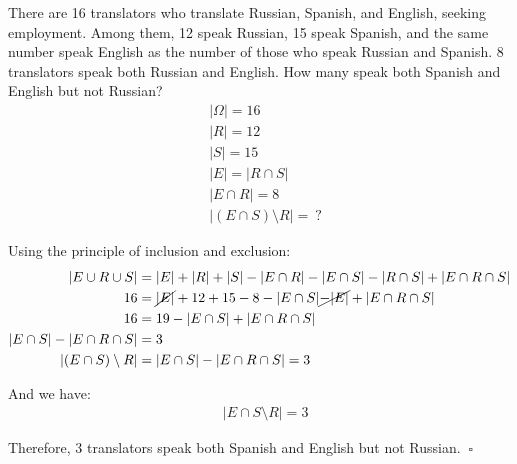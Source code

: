 \documentclass[a4paper,10pt]{article}
\begin{document}
\begin{problem}
	There are 16 translators who translate Russian, Spanish, and English, seeking employment. Among them, 12 speak Russian, 15 speak Spanish, and the same number speak English as the number of those who speak Russian and Spanish. 8 translators speak both Russian and English. How many speak both Spanish and English but not Russian?
	\[
		\begin{aligned}
			&|\Omega| = 16 \\
			&|R| = 12 \\
			&|S| = 15 \\
			&|E| = |R \cap S| \\
			&|E \cap R| = 8 \\
			&|(E \cap S) \setminus R| = \ ?
		\end{aligned}
	\]

	Using the principle of inclusion and exclusion:
	\[
		\begin{aligned}
			|E \cup R \cup S| &= |E| + |R| + |S| - |E \cap R| - |E \cap S| - |R \cap S| + |E \cap R \cap S| \\
			16 &= \cancel{|E|} + 12 + 15 - 8 - |E \cap S| \cancel{- |E|} + |E \cap R \cap S| \\
			16 &= 19 - |E \cap S| + |E \cap R \cap S| \\
			|E \cap S| - |E \cap R \cap S| &= 3 \\
			|(E \cap S)\setminus R| &= |E \cap S| - |E \cap R \cap S| = 3
		\end{aligned}
	\]

	And we have:
	\[
		\begin{aligned}
			&|E \cap S \setminus R| = 3
		\end{aligned}
	\]

	Therefore, 3 translators speak both Spanish and English but not Russian. \(\ \square \)
\end{problem}
\end{document}
